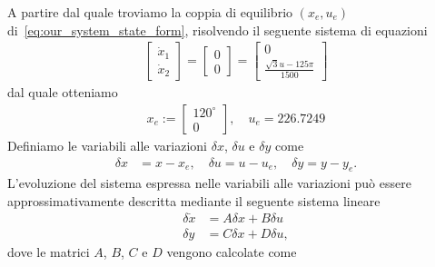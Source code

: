 \documentclass[a4paper, 11pt]{article}
\begin{document}
A partire dal quale troviamo la coppia di equilibrio $(x_e, u_e)$ di~\eqref{eq:our_system_state_form}, risolvendo il seguente sistema di equazioni
%
\begin{align}
	\begin{bmatrix}
		\dot{x}_1
		\\
		\dot{x}_2
	\end{bmatrix} = \begin{bmatrix}
		0
		\\
		0
	\end{bmatrix} = \begin{bmatrix}
		0
		\\
		\frac{\sqrt{3}u-125\pi}{1500}
	\end{bmatrix}
\end{align}
%
dal quale otteniamo
%
\begin{align}
	x_e := \begin{bmatrix}
		120^\circ
		\\
		0
	\end{bmatrix},  \quad u_e = 226.7249\label{eq:equilibirum_pair}
\end{align}
%
Definiamo le variabili alle variazioni $\delta x$, $\delta u$ e $\delta y$ come 
%
\begin{align*}
	\delta x &= x-x_e, 
	\quad
	\delta u = u-u_e, 
	\quad
	\delta y = y-y_e.
\end{align*}
%
L'evoluzione del sistema espressa nelle variabili alle variazioni pu\`o essere approssimativamente descritta mediante il seguente sistema lineare
%
\begin{subequations}\label{eq:linearized_system}
\begin{align}
	\delta \dot{x} &= A\delta x + B\delta u
	\\
	\delta y &= C\delta x + D\delta u,
\end{align}
\end{subequations}
%
dove le matrici $A$, $B$, $C$ e $D$ vengono calcolate come
%
\end{document}
